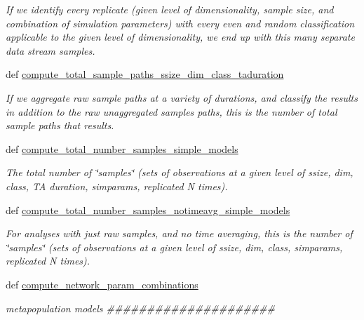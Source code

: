 \begin{DoxyCompactItemize}
\begin{DoxyCompactList}\small\item\em If we identify every replicate (given level of dimensionality, sample size, and combination of simulation parameters) with every even and random classification applicable to the given level of dimensionality, we end up with this many separate data stream samples. \end{DoxyCompactList}\item 
def \hyperlink{classctpy_1_1math_1_1simulation__calculations_1_1_simulation_calculations_a5f674e430d656ea58e8a65fecf828e89}{compute\-\_\-total\-\_\-sample\-\_\-paths\-\_\-ssize\-\_\-dim\-\_\-class\-\_\-taduration}
\begin{DoxyCompactList}\small\item\em If we aggregate raw sample paths at a variety of durations, and classify the results in addition to the raw unaggregated samples paths, this is the number of total sample paths that results. \end{DoxyCompactList}\item 
def \hyperlink{classctpy_1_1math_1_1simulation__calculations_1_1_simulation_calculations_a708d30886bbcf7f47275c068dcc48d22}{compute\-\_\-total\-\_\-number\-\_\-samples\-\_\-simple\-\_\-models}
\begin{DoxyCompactList}\small\item\em The total number of \char`\"{}samples\char`\"{} (sets of observations at a given level of ssize, dim, class, T\-A duration, simparams, replicated N times). \end{DoxyCompactList}\item 
def \hyperlink{classctpy_1_1math_1_1simulation__calculations_1_1_simulation_calculations_a0296fdc56eb45ac033f54911bd544003}{compute\-\_\-total\-\_\-number\-\_\-samples\-\_\-notimeavg\-\_\-simple\-\_\-models}
\begin{DoxyCompactList}\small\item\em For analyses with just raw samples, and no time averaging, this is the number of \char`\"{}samples\char`\"{} (sets of observations at a given level of ssize, dim, class, simparams, replicated N times). \end{DoxyCompactList}\item 
def \hyperlink{classctpy_1_1math_1_1simulation__calculations_1_1_simulation_calculations_af24f85fb2f5c2d6583d424450797e620}{compute\-\_\-network\-\_\-param\-\_\-combinations}
\begin{DoxyCompactList}\small\item\em metapopulation models \#\#\#\#\#\#\#\#\#\#\#\#\#\#\#\#\#\#\#\#\# \end{DoxyCompactList}\item 

\end{DoxyCompactItemize}
